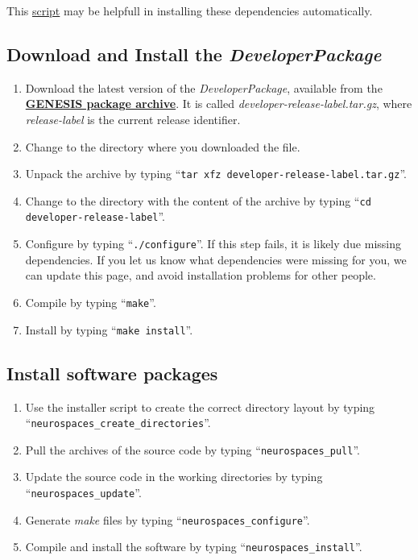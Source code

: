 \documentclass[12pt]{article}
\begin{document}
This \href{scripts/install-dependencies.sh}{script} may be helpfull in installing these dependencies automatically.


\subsection*{Download and Install the {\it DeveloperPackage}}

\begin{enumerate}
   \item Download the latest version of the {\it DeveloperPackage}, available from the \href{http://repo-genesis3.cbi.utsa.edu/src/}{\bf GENESIS package archive}. It is called {\it developer-release-label.tar.gz}, where {\it release-label} is the current release identifier.
   \item Change to the directory where you downloaded the file.
   \item Unpack the archive by typing ``{\tt tar xfz developer-release-label.tar.gz}''.
   \item Change to the directory with the content of the archive by typing ``{\tt cd developer-release-label}''.
   \item Configure by typing ``{\tt ./configure}''.  If this step fails, it is likely due missing dependencies.  If you let us know what dependencies were missing for you, we can update this page, and avoid installation problems for other people.
   \item Compile by typing ``{\tt make}''.
   \item Install by typing ``{\tt make install}''. 
\end{enumerate}

\subsection*{Install software packages}

\begin{enumerate}
   \item Use the installer script to create the correct directory layout by typing ``{\tt neurospaces\_create\_directories}''.
   \item Pull the archives of the source code by typing ``{\tt neurospaces\_pull}''.
   \item Update the source code in the working directories by typing ``{\tt neurospaces\_update}''.
   \item Generate {\it make} files by typing ``{\tt neurospaces\_configure}''.
   \item Compile and install the software by typing ``{\tt neurospaces\_install}''.
\end{enumerate}
\end{document}
